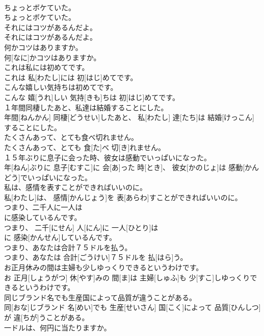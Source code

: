 \documentclass[8pt]{extreport}
\begin{document}
\begin{CJK}{UTF8}{min}
\\	ちょっとボケていた。	
\\	ちょっとボケていた。	
\\	それにはコツがあるんだよ。	
\\	それにはコツがあるんだよ。	
\\	何かコツはありますか。	
\\	何[なに]かコツはありますか。	
\\	これは私には初めてです。	
\\	これは 私[わたし]には 初[はじ]めてです。	
\\	こんな嬉しい気持ちは初めてです。	
\\	こんな 嬉[うれ]しい 気持[きも]ちは 初[はじ]めてです。	
\\	１年間同棲したあと、私達は結婚することにした。	
\\	年間[ねんかん] 同棲[どうせい]したあと、 私[わたし] 達[たち]は 結婚[けっこん]することにした。	
\\	たくさんあって、とても食べ切れません。	
\\	たくさんあって、とても 食[た]べ 切[き]れません。	
\\	１５年ぶりに息子に会った時、彼女は感動でいっぱいになった。	
\\	年[ねん]ぶりに 息子[むすこ]に 会[あ]った 時[とき]、 彼女[かのじょ]は 感動[かんどう]でいっぱいになった。	
\\	私は、感情を表すことができればいいのに。	
\\	私[わたし]は、 感情[かんじょう]を 表[あらわ]すことができればいいのに。	
\\	つまり、二千人に一人は
\\	に感染しているんです。	
\\	つまり、 二千[にせん] 人[にん]に 一人[ひとり]は 
\\	に 感染[かんせん]しているんです。	
\\	つまり、あなたは合計７５ドルを払う。	
\\	つまり、あなたは 合計[ごうけい]７５ドルを 払[はら]う。	
\\	お正月休みの間は主婦も少しゆっくりできるというわけです。	
\\	お 正月[しょうがつ] 休[やす]みの 間[ま]は 主婦[しゅふ]も 少[すこ]しゆっくりできるというわけです。	
\\	同じブランド名でも生産国によって品質が違うことがある。	
\\	同[おな]じブランド 名[めい]でも 生産[せいさん] 国[こく]によって 品質[ひんしつ]が 違[ちが]うことがある。	
\\	一ドルは、何円に当たりますか。	

\end{CJK}
\end{document}
